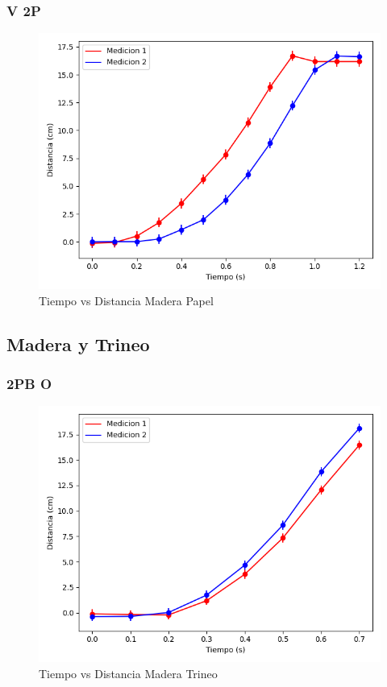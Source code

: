 \documentclass[12pt,a4]{article}
\begin{document}
\subsubsection{V 2P}

\begin{figure}[H]
    \centering
    \includegraphics[width=0.9\linewidth]{TiempoVsDistanciaPisoHojaV_2P.png}
    \caption{Tiempo vs Distancia Madera Papel}
    \label{fig:TvDV_2P piso hoja}
\end{figure}


\subsection{Madera y Trineo}

\subsubsection{2PB O}

\begin{figure}[H]
    \centering
    \includegraphics[width=0.9\linewidth]{TiempoVsDistanciaPisoMadera2PB_O.png}
    \caption{Tiempo vs Distancia Madera Trineo}
    \label{fig:TvD2PB_O piso trineo}

\end{figure}
\end{document}
